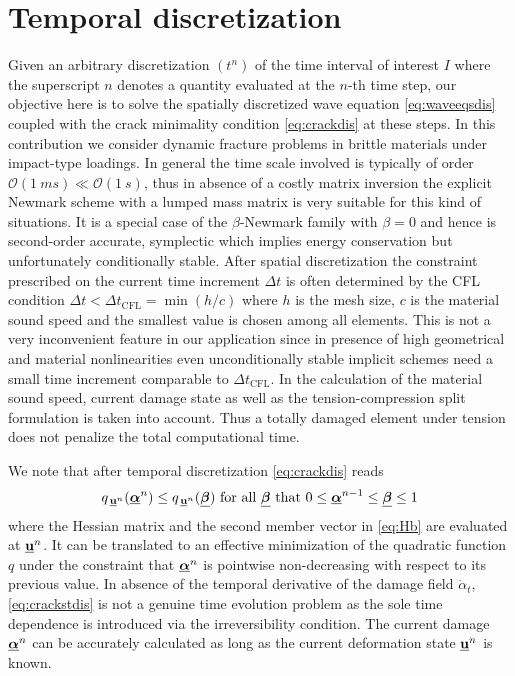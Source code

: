 \section{Temporal discretization}
Given an arbitrary discretization $(t^n)$ of the time interval of interest $I$ where the superscript $n$ denotes a quantity evaluated at the $n$-th time step, our objective here is to solve the spatially discretized wave equation \eqref{eq:waveeqsdis} coupled with the crack minimality condition \eqref{eq:crackdis} at these steps. In this contribution we consider dynamic fracture problems in brittle materials under impact-type loadings. In general the time scale involved is typically of order $\mathcal{O}(\SI{1}{ms})\ll\mathcal{O}(\SI{1}{s})$, thus in absence of a costly matrix inversion the explicit Newmark scheme with a lumped mass matrix is very suitable for this kind of situations. It is a special case of the $\beta$-Newmark family \cite{Newmark:1959} with $\beta=0$ and hence is second-order accurate, symplectic which implies energy conservation but unfortunately conditionally stable. After spatial discretization the constraint prescribed on the current time increment $\Delta t$ is often determined by the CFL condition $\Delta t<\Delta t_\mathrm{CFL}=\min(h/c)$ where $h$ is the mesh size, $c$ is the material sound speed and the smallest value is chosen among all elements. This is not a very inconvenient feature in our application since in presence of high geometrical and material nonlinearities even unconditionally stable implicit schemes need a small time increment comparable to $\Delta t_\mathrm{CFL}$. In the calculation of the material sound speed, current damage state as well as the tension-compression split formulation is taken into account. Thus a totally damaged element under tension does not penalize the total computational time.

We note that after temporal discretization \eqref{eq:crackdis} reads
\begin{equation} \label{eq:crackstdis}
q_{\,\uvec^n}(\dvec^n)\leq q_{\,\uvec^n}(\underline{\vec{\beta}}) \text{ for all $\underline{\vec{\beta}}$ that $0\leq\dvec^{n-1}\leq\underline{\vec{\beta}}\leq 1$}
\end{equation}
where the Hessian matrix and the second member vector in \eqref{eq:Hb} are evaluated at $\uvec^n$. It can be translated to an effective minimization of the quadratic function $q$ under the constraint that $\dvec^n$ is pointwise non-decreasing with respect to its previous value. In absence of the temporal derivative of the damage field $\dot{\alpha}_t$, \eqref{eq:crackstdis} is not a genuine time evolution problem as the sole time dependence is introduced via the irreversibility condition. The current damage $\dvec^n$ can be accurately calculated as long as the current deformation state $\uvec^n$ is known.


